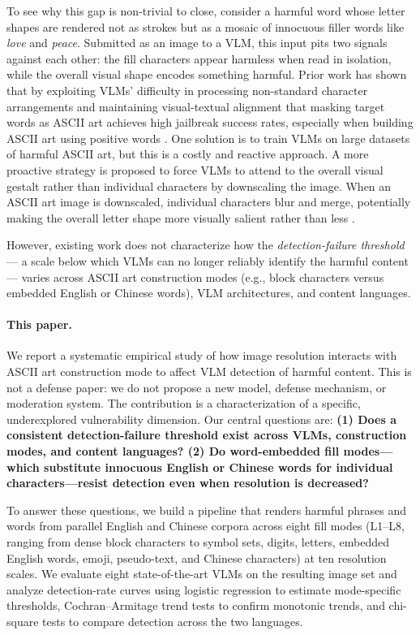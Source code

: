 \documentclass[11pt]{article}
\begin{document}
To see why this gap is non-trivial to close, consider a harmful word whose letter shapes are
rendered not as strokes but as a mosaic of innocuous filler words like \textit{love} and
\textit{peace}. Submitted as an image to a VLM, this input pits two signals against each other:
the fill characters appear harmless when read in isolation, while the overall visual shape encodes
something harmful. Prior work has shown that by exploiting VLMs' difficulty in processing non-standard 
character arrangements and maintaining visual-textual alignment that masking target words as ASCII art achieves 
high jailbreak success rates, especially when building ASCII art using positive words \citep{jiang2024artprompt,wang2025text}. 
One solution is to train VLMs on large datasets of harmful ASCII art, but this is a costly and reactive approach.
A more proactive strategy is proposed to force VLMs to attend to the overall visual gestalt rather than individual characters 
by downscaling the image. When an ASCII art image is downscaled, individual characters blur and merge, 
potentially making the overall letter shape more visually salient rather than less \citep{jia2025asvii_eval}.

However, existing work does not characterize how the \textit{detection-failure threshold}
--- a scale below which VLMs can no longer reliably identify the harmful content --- varies across
ASCII art construction modes (e.g., block characters versus embedded English or Chinese
words), VLM architectures, and content languages.

\paragraph{This paper.} We report a systematic empirical study of how image resolution interacts
with ASCII art construction mode to affect VLM detection of harmful content. This is not a defense
paper: we do not propose a new model, defense mechanism, or moderation system. The contribution is
a characterization of a specific, underexplored vulnerability dimension. Our central questions are:
\textbf{(1) Does a consistent detection-failure threshold exist across VLMs, construction modes,
and content languages? (2) Do word-embedded fill modes---which substitute innocuous English or
Chinese words for individual characters---resist detection even when resolution is decreased?}

To answer these questions, we build a pipeline that renders harmful phrases and words from parallel English 
and Chinese corpora across eight fill modes (L1--L8, ranging from dense block characters to symbol
sets, digits, letters, embedded English words, emoji, pseudo-text, and Chinese characters) at ten
resolution scales. We evaluate eight state-of-the-art VLMs on the resulting image set and analyze
detection-rate curves using logistic regression to estimate mode-specific thresholds,
Cochran--Armitage trend tests to confirm monotonic trends, and chi-square tests to compare
detection across the two languages.
\end{document}
